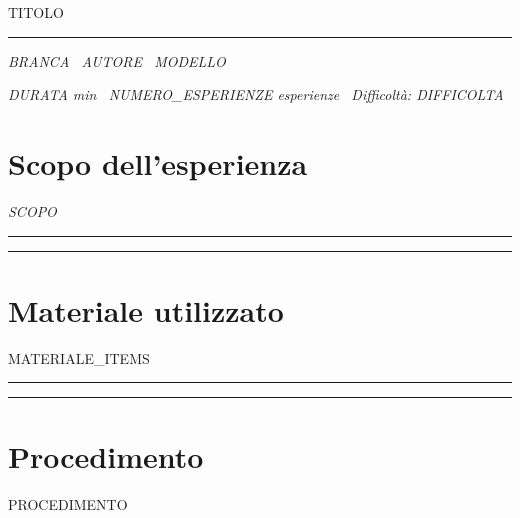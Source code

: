 \documentclass[11pt,a4paper]{article}
\newcommand{\ornamento}{%
  \begin{center}
    \color{accent}\rule{0.32\linewidth}{0.4pt}\quad\textasteriskcentered\quad\rule{0.32\linewidth}{0.4pt}
  \end{center}
}
\begin{document}
\begin{center}
  {\Huge\scshape\color{accentstrong} {{TITOLO}}\par}
  \vspace{4pt}
  \color{accent}\rule{0.5\linewidth}{0.6pt}\par
  \vspace{6pt}
  {\small\itshape\color{inksoft}
    {{BRANCA}} \textperiodcentered\ {{AUTORE}} \textperiodcentered\ {{MODELLO}}\par
  }
  {\small\itshape\color{inksoft}
    {{DURATA}} min \textperiodcentered\ {{NUMERO_ESPERIENZE}} esperienze
    \textperiodcentered\ Difficoltà: {{DIFFICOLTA}}\par
  }
\end{center}

\vspace{10pt}

\section*{Scopo dell'esperienza}
{\itshape {{SCOPO}}\par}

\ornamento

\section*{Materiale utilizzato}
\begin{itemize}
{{MATERIALE_ITEMS}}
\end{itemize}

\ornamento

\section*{Procedimento}
{{PROCEDIMENTO}}
\end{document}
